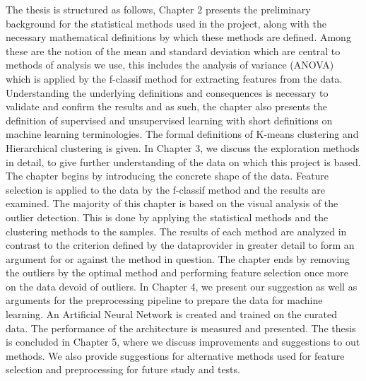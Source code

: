 The thesis is structured as follows, Chapter 2 presents the preliminary  background for the statistical methods used in the project, along with the necessary mathematical definitions by which these methods are defined. Among these are the notion of the mean and standard deviation which are central to methods of analysis we use, this includes the analysis of variance (ANOVA) which is applied by the f-classif method for extracting features from the data. Understanding the underlying definitions and consequences is necessary to validate and confirm the results and as such, the chapter also presents the definition of supervised and unsupervised learning with short definitions on machine learning terminologies. The formal definitions of K-means clustering and Hierarchical clustering is given. In Chapter 3, we discuss the exploration methods in detail, to give further understanding of the data on which this project is based. The chapter begins by introducing the concrete shape of the data. Feature selection is applied to the data by the f-classif method and the results are examined. The majority of this chapter is based on the visual analysis of the outlier detection. This is done by applying the statistical methods and the clustering methods to the samples. The results of each method are analyzed in contrast to the criterion defined by the dataprovider in greater detail to form an argument for or against the method in question. The chapter ends by removing the outliers by the optimal method and performing feature selection once more on the data devoid of outliers. In Chapter 4, we present our suggestion as well as arguments for the preprocessing pipeline to prepare the data for machine learning. An Artificial Neural Network is created and trained on the curated data. The performance of the architecture is measured and presented. The thesis is concluded in Chapter 5, where we discuss improvements and suggestions to out methods. We also provide suggestions for alternative methods used for feature selection and preprocessing for future study and tests.